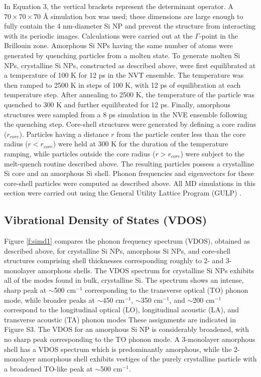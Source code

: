 In Equation 3, the vertical brackets represent the determinant operator. A $70 \times 70 \times 70$ \r{A} simulation box was used; these dimensions are large enough to fully contain the 4 nm-diameter Si NP and prevent the structure from interacting with its periodic images. Calculations were carried out at the $\Gamma$-point in the Brillouin zone. Amorphous Si NPs having the same number of atoms were generated by quenching particles from a molten state. To generate molten Si NPs, crystalline Si NPs, constructed as described above, were first equilibrated at a temperature of 100 K for 12 ps in the NVT ensemble. The temperature was then ramped to 2500 K in steps of 100 K, with 12 ps of equilibration at each temperature step. After annealing to 2500 K, the temperature of the particle was quenched to 300 K and further equilibrated for 12 ps. Finally, amorphous structures were sampled from a 8 ps simulation in the NVE ensemble following the quenching step. Core-shell structures were generated by defining a core radius ($r_{core}$). Particles having a distance $r$ from the particle center less than the core radius ($r < r_{core}$) were held at 300 K for the duration of the temperature ramping, while particles outside the core radius ($r > r_{core}$) were subject to the melt-quench routine described above. The resulting particles possess a crystalline Si core and an amorphous Si shell. Phonon frequencies and eigenvectors for these core-shell particles were computed as described above. All MD simulations in this section were carried out using the General Utility Lattice Program (GULP) \cite{gale2003general}.

\subsection{Vibrational Density of States (VDOS)}
Figure \ref{f:simd1} compares the phonon frequency spectrum (VDOS), obtained as described above, for crystalline Si NPs, amorphous Si NPs, and core-shell structures comprising shell thicknesses corresponding roughly to 2- and 3-monolayer amorphous shells. The VDOS spectrum for crystalline Si NPs exhibits all of the modes found in bulk, crystalline Si. The spectrum shows an intense, sharp peak at $\sim$500 cm$^{-1}$ corresponding to the transverse optical (TO) phonon mode, while broader peaks at $\sim$450 cm$^{-1}$, $\sim$350 cm$^{-1}$, and $\sim$200 cm$^{-1}$ correspond to the longitudinal optical (LO), longitudinal acoustic (LA), and transverse acoustic (TA) phonon modes \cite{dolling1966thermodynamic} These assignments are indicated in Figure S3. The VDOS for an amorphous Si NP is considerably broadened, with no sharp peak corresponding to the TO phonon mode. A 3-monolayer amorphous shell has a VDOS spectrum which is predominantly amorphous, while the 2-monolayer amorphous shell exhibits vestiges of the purely crystalline particle with a broadened TO-like peak at $\sim$500 cm$^{-1}$. 

